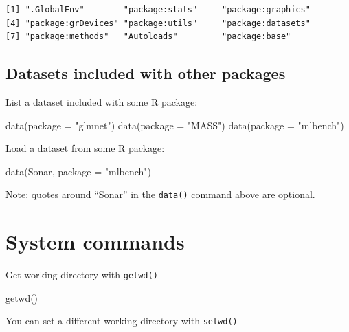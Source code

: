 \documentclass[
]{book}
\newenvironment{Shaded}{\begin{snugshade}}{\end{snugshade}}
\newcommand{\AttributeTok}[1]{\textcolor[rgb]{0.77,0.63,0.00}{#1}}
\newcommand{\FunctionTok}[1]{\textcolor[rgb]{0.00,0.00,0.00}{#1}}
\newcommand{\NormalTok}[1]{#1}
\newcommand{\StringTok}[1]{\textcolor[rgb]{0.31,0.60,0.02}{#1}}
\begin{document}
\begin{verbatim}
[1] ".GlobalEnv"        "package:stats"     "package:graphics" 
[4] "package:grDevices" "package:utils"     "package:datasets" 
[7] "package:methods"   "Autoloads"         "package:base"     
\end{verbatim}

\hypertarget{datasets-included-with-other-packages}{%
\subsection{Datasets included with other packages}\label{datasets-included-with-other-packages}}

List a dataset included with some R package:

\begin{Shaded}
\begin{Highlighting}[]
\FunctionTok{data}\NormalTok{(}\AttributeTok{package =} \StringTok{"glmnet"}\NormalTok{)}
\FunctionTok{data}\NormalTok{(}\AttributeTok{package =} \StringTok{"MASS"}\NormalTok{)}
\FunctionTok{data}\NormalTok{(}\AttributeTok{package =} \StringTok{"mlbench"}\NormalTok{)}
\end{Highlighting}
\end{Shaded}

Load a dataset from some R package:

\begin{Shaded}
\begin{Highlighting}[]
\FunctionTok{data}\NormalTok{(Sonar, }\AttributeTok{package =} \StringTok{"mlbench"}\NormalTok{)}
\end{Highlighting}
\end{Shaded}

Note: quotes around ``Sonar'' in the \texttt{data()} command above are optional.

\hypertarget{system-commands}{%
\section{System commands}\label{system-commands}}

Get working directory with \texttt{getwd()}

\begin{Shaded}
\begin{Highlighting}[]
\FunctionTok{getwd}\NormalTok{()}
\end{Highlighting}
\end{Shaded}

You can set a different working directory with \texttt{setwd()}
\end{document}
